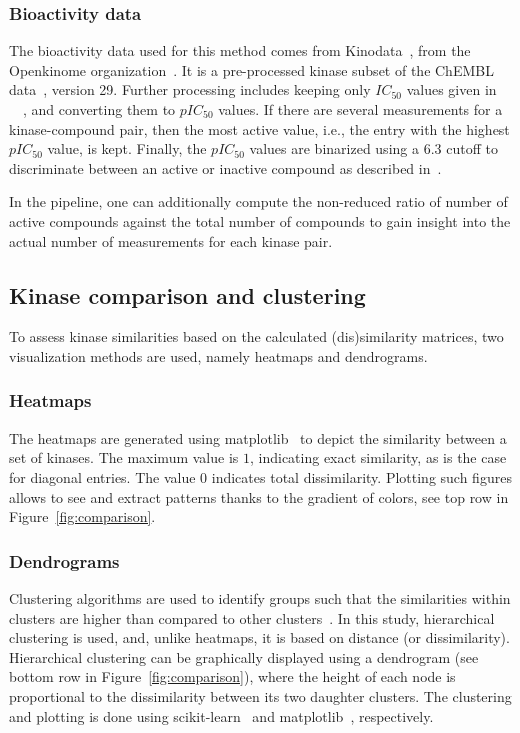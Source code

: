 \documentclass[9pt,training,ASAPversion]{livecoms}
\begin{document}
\subsubsection{Bioactivity data}
The bioactivity data used for this method comes from Kinodata~\cite{kinodata_2022}, from the Openkinome organization~\cite{openkinome_feb_2022}. It is a pre-processed kinase subset of the ChEMBL data~\cite{Gaulton_2016_nar}, version 29. Further processing includes keeping only $IC_{50}$ values given in \SI{}{\nano\Molar}, and converting them to $pIC_{50}$ values. If there are several measurements for a kinase-compound pair, then the most active value, i.e., the entry with the highest $pIC_{50}$ value, is kept. Finally, the $pIC_{50}$ values are binarized using a $6.3$ cutoff to discriminate between an active or inactive compound as described in~\cite{Merget_2017_JMedChem}. 

In the pipeline, one can additionally compute the non-reduced ratio of number of active compounds against the total number of compounds to gain insight into the actual number of measurements for each kinase pair.

\subsection{Kinase comparison and clustering}
\label{sec:comparison}
To assess kinase similarities based on the calculated (dis)similarity matrices, two visualization methods are used, namely heatmaps and dendrograms.

\subsubsection{Heatmaps}
The heatmaps are generated using matplotlib~\cite{Hunter_2007_IEEE} to depict the similarity between a set of kinases. The maximum value is $1$, indicating exact similarity, as is the case for diagonal entries. The value $0$ indicates total dissimilarity. Plotting such figures allows to see and extract patterns thanks to the gradient of colors, see top row in Figure~\ref{fig:comparison}.

\subsubsection{Dendrograms}
Clustering algorithms are used to identify groups such that the similarities within clusters are higher than compared to other clusters~\cite{Hastie_2009_ESLii}. In this study, hierarchical clustering is used, and, unlike heatmaps, it is based on distance (or dissimilarity). Hierarchical clustering can be graphically displayed using a dendrogram (see bottom row in Figure~\ref{fig:comparison}), where the height of each node is proportional to the dissimilarity between its two daughter clusters. The clustering and plotting is done using scikit-learn~\cite{Pedregosa_2011_JMLR} and matplotlib~\cite{Hunter_2007_IEEE}, respectively.
\end{document}
